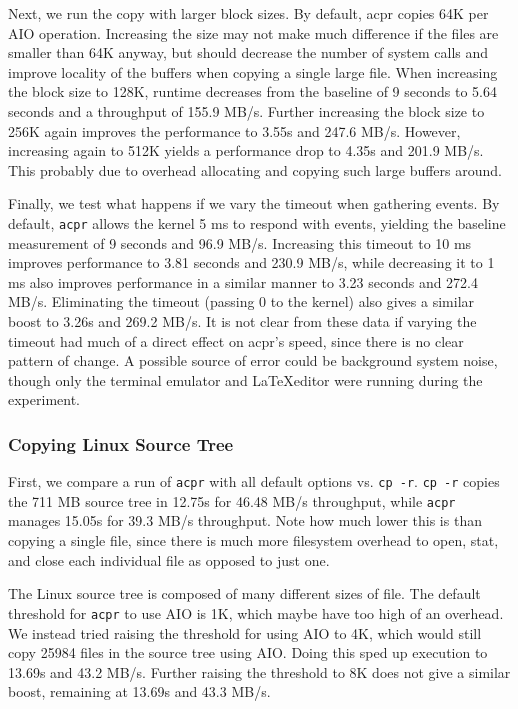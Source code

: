 \documentclass[11pt]{article}
\begin{document}
Next, we run the copy with larger block sizes. By default, acpr copies 64K per AIO operation. Increasing the size may not make much difference if the files are smaller than 64K anyway, but should decrease the number of system calls and improve locality of the buffers when copying a single large file. When increasing the block size to 128K, runtime decreases from the baseline of 9 seconds to 5.64 seconds and a throughput of 155.9 MB/s. Further increasing the block size to 256K again improves the performance to 3.55s and 247.6 MB/s. However, increasing again to 512K yields a performance drop to 4.35s and 201.9 MB/s. This probably due to overhead allocating and copying such large buffers around.

Finally, we test what happens if we vary the timeout when gathering events. By default, \texttt{acpr} allows the kernel 5 ms to respond with events, yielding the baseline measurement of 9 seconds and 96.9 MB/s. Increasing this timeout to 10 ms improves performance to 3.81 seconds and 230.9 MB/s, while decreasing it to 1 ms also improves performance in a similar manner to 3.23 seconds and 272.4 MB/s. Eliminating the timeout (passing 0 to the kernel) also gives a similar boost to 3.26s and 269.2 MB/s. It is not clear from these data if varying the timeout had much of a direct effect on acpr's speed, since there is no clear pattern of change. A possible source of error could be background system noise, though only the terminal emulator and \LaTeX editor were running during the experiment.

\subsubsection{Copying Linux Source Tree}
First, we compare a run of \texttt{acpr} with all default options vs. \texttt{cp -r}. \texttt{cp -r} copies the 711 MB source tree in 12.75s for 46.48 MB/s throughput, while \texttt{acpr} manages 15.05s for 39.3 MB/s throughput. Note how much lower this is than copying a single file, since there is much more filesystem overhead to open, stat, and close each individual file as opposed to just one. 

The Linux source tree is composed of many different sizes of file. The default threshold for \texttt{acpr} to use AIO is 1K, which maybe have too high of an overhead. We instead tried raising the threshold for using AIO to 4K, which would still copy 25984 files in the source tree using AIO. Doing this sped up execution to 13.69s and 43.2 MB/s. Further raising the threshold to 8K does not give a similar boost, remaining at 13.69s and 43.3 MB/s.
\end{document}
